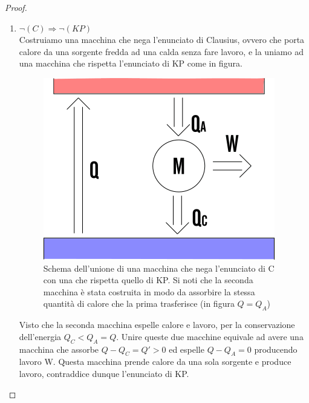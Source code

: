\documentclass[
10pt, %
a4paper, %
oneside, %
headinclude,footinclude, %
BCOR5mm, %
]{scrartcl}
\begin{document}
\begin{proof}
\begin{enumerate}
	\item \(\neg(C)\Rightarrow \neg(KP)\)\\
	
	Costruiamo una macchina che nega l'enunciato di Clausius, ovvero che porta calore da una sorgente fredda ad una calda senza fare lavoro, e la uniamo ad una macchina che rispetta l'enunciato di KP come in figura.
	\begin{figure}[h!]
		\centering
		\includegraphics[width=0.5\linewidth]{../images/C-KP}
		\caption{Schema dell'unione di una macchina che nega l'enunciato di C con una che rispetta quello di KP. Si noti che la seconda macchina è stata costruita in modo da assorbire la stessa quantità di calore che la prima trasferisce (in figura \(Q = Q_A\)) }
		\label{fig:c-kp}
	\end{figure}
	\FloatBarrier
	Visto che la seconda macchina espelle calore e lavoro, per la conservazione dell'energia \(Q_C<Q_A=Q\).
	Unire queste due macchine equivale ad avere una macchina che assorbe \(Q-Q_C = Q' > 0 \) ed espelle \(Q-Q_A = 0\) producendo lavoro W. Questa macchina prende calore da una sola sorgente e produce lavoro, contraddice dunque l'enunciato di KP.  
\end{enumerate} 
\end{proof}
\end{document}
